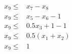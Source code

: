 

\begin{equation}
    \begin{aligned}
        x_9 \leq  &  x_7 - x_8 &\\
        x_9 \leq  & x_5 - x_6 - 1 \\
        x_9 \leq  & 0.5x_3 + 1 - 1 &\\
        x_9 \leq  & 0.5(x_1+x_2) \\
        x_9 \leq  & 1\\
   \end{aligned}
\label{eq:deeppoly}
\end{equation}


